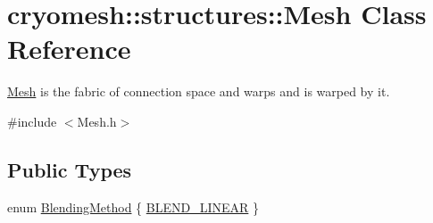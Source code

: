 \hypertarget{classcryomesh_1_1structures_1_1Mesh}{\section{cryomesh\-:\-:structures\-:\-:\-Mesh \-Class \-Reference}
\label{classcryomesh_1_1structures_1_1Mesh}
}


\hyperlink{classcryomesh_1_1structures_1_1Mesh}{\-Mesh} is the fabric of connection space and warps and is warped by it.  




{\ttfamily \#include $<$\-Mesh.\-h$>$}

\subsection*{\-Public \-Types}
\begin{DoxyCompactItemize}
\item 
enum \hyperlink{classcryomesh_1_1structures_1_1Mesh_a5899ce5c4ac651fe82d0bd7b25d4b743}{\-Blending\-Method} \{ \hyperlink{classcryomesh_1_1structures_1_1Mesh_a5899ce5c4ac651fe82d0bd7b25d4b743a9e12dc9ac54b6b1eadbe806b90caf332}{\-B\-L\-E\-N\-D\-\_\-\-L\-I\-N\-E\-A\-R}
 \}
\end{DoxyCompactItemize}
